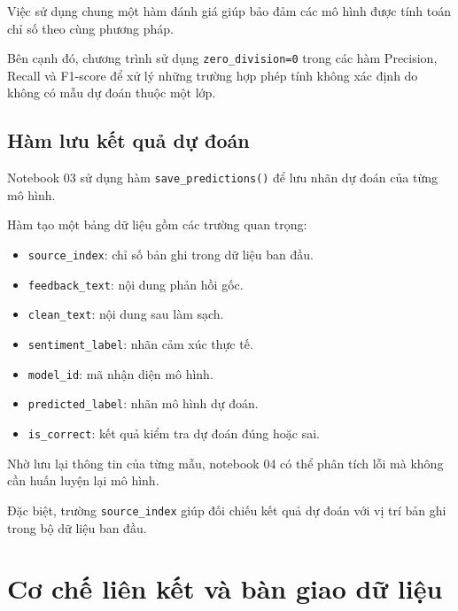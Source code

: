 Việc sử dụng chung một hàm đánh giá giúp bảo đảm các mô hình được tính toán chỉ số theo cùng phương pháp.

Bên cạnh đó, chương trình sử dụng \texttt{zero\_division=0} trong các hàm Precision, Recall và F1-score để xử lý những trường hợp phép tính không xác định do không có mẫu dự đoán thuộc một lớp.


\subsection{Hàm lưu kết quả dự đoán}

Notebook 03 sử dụng hàm \texttt{save\_predictions()} để lưu nhãn dự đoán của từng mô hình.

Hàm tạo một bảng dữ liệu gồm các trường quan trọng:

\begin{itemize}
    \item \texttt{source\_index}: chỉ số bản ghi trong dữ liệu ban đầu.

    \item \texttt{feedback\_text}: nội dung phản hồi gốc.

    \item \texttt{clean\_text}: nội dung sau làm sạch.

    \item \texttt{sentiment\_label}: nhãn cảm xúc thực tế.

    \item \texttt{model\_id}: mã nhận diện mô hình.

    \item \texttt{predicted\_label}: nhãn mô hình dự đoán.

    \item \texttt{is\_correct}: kết quả kiểm tra dự đoán đúng hoặc sai.
\end{itemize}

Nhờ lưu lại thông tin của từng mẫu, notebook 04 có thể phân tích lỗi mà không cần huấn luyện lại mô hình.

Đặc biệt, trường \texttt{source\_index} giúp đối chiếu kết quả dự đoán với vị trí bản ghi trong bộ dữ liệu ban đầu.



\section{Cơ chế liên kết và bàn giao dữ liệu}

